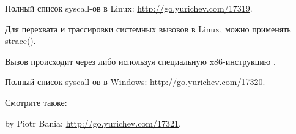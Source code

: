 Полный список syscall-ов в Linux: \url{http://go.yurichev.com/17319}.

Для перехвата и трассировки системных вызовов в Linux, можно применять strace().



Вызов происходит через  
либо используя специальную x86-инструкцию .

Полный список syscall-ов в Windows: \url{http://go.yurichev.com/17320}.

Смотрите также:

 by Piotr Bania: \url{http://go.yurichev.com/17321}.

